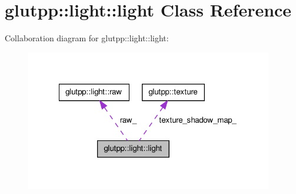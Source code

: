 \hypertarget{classglutpp_1_1light_1_1light}{\section{glutpp\-:\-:light\-:\-:light \-Class \-Reference}
\label{classglutpp_1_1light_1_1light}
}


\-Collaboration diagram for glutpp\-:\-:light\-:\-:light\-:
\nopagebreak
\begin{figure}[H]
\begin{center}
\leavevmode
\includegraphics[width=306pt]{classglutpp_1_1light_1_1light__coll__graph}
\end{center}
\end{figure}
